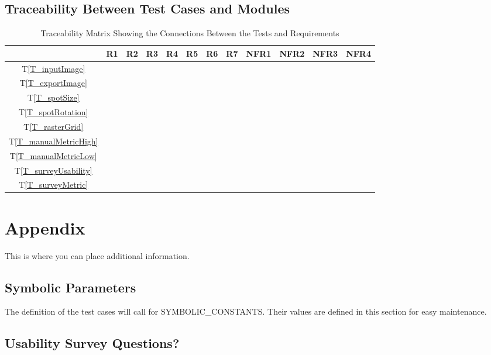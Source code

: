 \documentclass[12pt, titlepage]{article}
\newcommand{\tref}[1]{T\ref{#1}}
\begin{document}
\subsection{Traceability Between Test Cases and Modules}


\begin{table}[h!]
  \centering
  \begin{tabular}{|c|c|c|c|c|c|c|c|c|c|c|c|}
  \hline
    & R1
    & R2
    & R3
    & R4
    & R5
    & R6
    & R7
    & NFR1
    & NFR2
    & NFR3
    & NFR4
  \\ \hline
  \tref{T_inputImage}        & & & & & & & & & & & \\ \hline
  \tref{T_exportImage}       & & & & & & & & & & & \\ \hline
  \tref{T_spotSize}          & & & & & & & & & & & \\ \hline
  \tref{T_spotRotation}      & & & & & & & & & & & \\ \hline
  \tref{T_rasterGrid}        & & & & & & & & & & & \\ \hline
  \tref{T_manualMetricHigh}  & & & & & & & & & & & \\ \hline
  \tref{T_manualMetricLow}   & & & & & & & & & & & \\ \hline
  \tref{T_surveyUsability}   & & & & & & & & & & & \\ \hline
  \tref{T_surveyMetric}      & & & & & & & & & & & \\ \hline
  \end{tabular}
  \caption{Traceability Matrix Showing the Connections Between the Tests and Requirements}
  \label{Table:A_trace}
\end{table}


\newpage
\clearpage




\newpage

\section{Appendix}

This is where you can place additional information.

\subsection{Symbolic Parameters}

The definition of the test cases will call for SYMBOLIC\_CONSTANTS.
Their values are defined in this section for easy maintenance.

\subsection{Usability Survey Questions?} \label{survey_usability}

\end{document}
